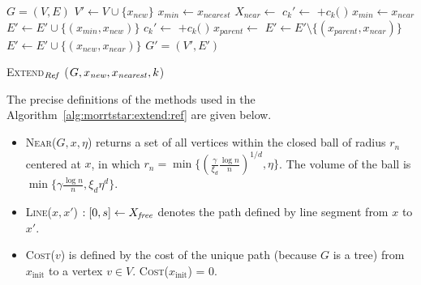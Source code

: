 \documentclass{article}
\begin{document}
\begin{algorithm}[hbtp]
\begin{algorithmic}[1]
	\Return $G=(V,E)$ 
\EndIf
\State $ V' \leftarrow V \cup \{ x_{new} \} $
\State $ x_{min} \leftarrow x_{nearest} $
\State $ X_{near} \leftarrow $ 
			\State $ c_{k}' \leftarrow $  $ + c_{k}( $  $ ) $ 
			\State $ x_{min} \leftarrow x_{near} $
			\EndIf
		\EndIf
	\EndFor
	\State $ E' \leftarrow E' \cup \{ ( x_{min}, x_{new} ) \} $
{}
	    \State $ c_{k}' \leftarrow $  $ + c_{k}( $  $ ) $ 
			\State $ x_{parent} \leftarrow $ 
			\State $ E' \leftarrow E' \setminus \{ ( x_{parent}, x_{near} ) \} $
			\State $ E' \leftarrow E' \cup \{ ( x_{new}, x_{near} ) \} $
		\EndIf
	\EndIf
\EndFor
\Return $ G' = (V', E') $ 
\end{algorithmic}
\caption{ \textsc{Extend}$_{\it Ref} $ ($ G, x_{\it new}, x_{\it nearest},k$) }
\label{alg:morrtstar:extend:ref}
\end{algorithm} 

The precise definitions of the methods used in the Algorithm~\ref{alg:morrtstar:extend:ref} are given below.
\begin{itemize}
	\item \textsc{Near}($ G, x, \eta $) returns a set of all vertices within the closed ball of radius $ r_{n} $ centered at $ x $, in which $ r_{n} = \min \{ ( \frac{\gamma}{\xi_{d}} \frac{\log n}{n} )^{1/d}  , \eta \} $.
	The volume of the ball is $ \min \{ \gamma \frac{\log n}{n} , \xi_{d} \eta^{d} \} $.

	\item \textsc{Line}($ x, x' $) $ : [0, s] \leftarrow X_{\it free} $ denotes the path defined by line segment from $x$ to $x'$.
	
	\item \textsc{Cost}($ v  $) is defined by the cost of the unique path (because $G$ is a tree) from $ x_{ \mbox{init} } $ to a vertex $ v \in V $. \textsc{Cost}($ x_{ \mbox{init} } $) = $ 0 $.
\end{itemize}
\end{document}
